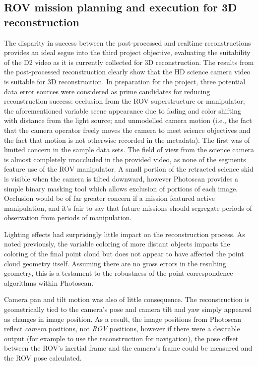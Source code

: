 \documentclass[letterpaper,12pt]{article}
\begin{document}
 
 
\subsection{ROV mission planning and execution for 3D reconstruction}

The disparity in success between the post-processed and realtime reconstructions provides an ideal segue into the third project objective, evaluating the suitability of the D2 video as it is currently collected for 3D reconstruction.  The results from the post-processed reconstruction clearly show that the HD science camera video is suitable for 3D reconstruction.  In preparation for the project, three potential data error sources were considered as prime candidates for reducing reconstruction success:   occlusion from the ROV superstructure or manipulator; the aforementioned variable scene appearance due to fading and color shifting with distance from the light source; and unmodelled camera motion (i.e., the fact that the camera operator freely moves the camera to meet science objectives and the fact that motion is not otherwise recorded in the metadata).     The first was of limited concern in the sample data sets.    The field of view from the science camera is almost completely unoccluded in the provided video, as none of the segments feature use of the ROV manipulator.   A small portion of the retracted science skid is visible when the camera is tilted downward, however Photoscan provides a simple binary masking tool which allows exclusion of portions of each image.   Occlusion would be of far greater concern if a mission featured active manipulation, and it's fair to say that future missions should segregate periods of observation from periods of manipulation.

Lighting effects had surprisingly little impact on the reconstruction process.  As noted previously, the variable coloring of more distant objects impacts the coloring of the final point cloud but does not appear to have affected the point cloud geometry itself.   Assuming there are no gross errors in the resulting geometry, this is a testament to the robustness of the point correspondence algorithms within Photoscan.  

Camera pan and tilt motion was also of little consequence.  The reconstruction is geometrically tied to the camera's pose and camera tilt and yaw simply appeared as changes in image position.  As a result, the image positions from Photoscan reflect \textit{camera} positions, not \textit{ROV} positions, however if there were a desirable output (for example to use the reconstruction for navigation), the pose offset between the ROV's inertial frame and the camera's frame could be measured and the ROV pose calculated.
\end{document}

